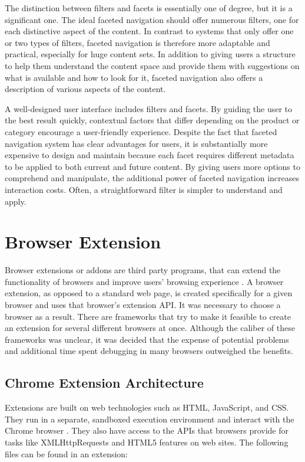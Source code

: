 The distinction between filters and facets is essentially one of degree, but it is a significant one. The ideal faceted navigation should offer numerous filters, one for each distinctive aspect of the content. In contrast to systems that only offer one or two types of filters, faceted navigation is therefore more adaptable and practical, especially for huge content sets. In addition to giving users a structure to help them understand the content space and provide them with suggestions on what is available and how to look for it, faceted navigation also offers a description of various aspects of the content.

A well-designed user interface includes filters and facets. By guiding the user to the best result quickly, contextual factors that differ depending on the product or category encourage a user-friendly experience. Despite the fact that faceted navigation system has clear advantages for users, it is substantially more expensive to design and maintain because each facet requires different metadata to be applied to both current and future content. By giving users more options to comprehend and manipulate, the additional power of faceted navigation increases interaction costs. Often, a straightforward filter is simpler to understand and apply.


\section{Browser Extension}
Browser extensions or addons are third party programs, that can extend the functionality of browsers and improve users' browsing experience \autocite{some2019empoweb}. A browser extension, as opposed to a standard web page, is created specifically for a given browser and uses that browser's extension API. It was necessary to choose a browser as a result. There are frameworks that try to make it feasible to create an extension for several different browsers at once. Although the caliber of these frameworks was unclear, it was decided that the expense of potential problems and additional time spent debugging in many browsers outweighed the benefits.

\subsection{Chrome Extension Architecture}
Extensions are built on web technologies such as HTML, JavaScript, and CSS. They run in a separate, sandboxed execution environment and interact with the Chrome browser \autocite{google2021what}. They also have access to the APIs that browsers provide for tasks like XMLHttpRequests and HTML5 features on web sites. The following files can be found in an extension:

